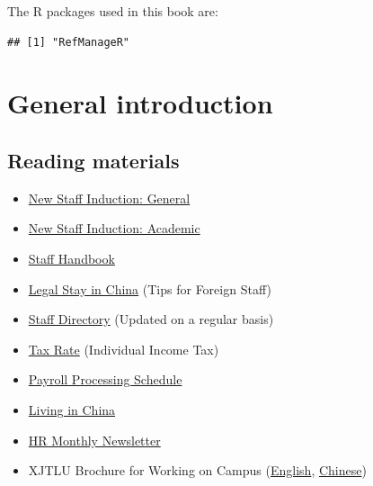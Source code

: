 \documentclass[
]{book}
\providecommand{\tightlist}{%
  \setlength{\itemsep}{0pt}\setlength{\parskip}{0pt}}
\begin{document}
The R packages used in this book are:

\begin{verbatim}
## [1] "RefManageR"
\end{verbatim}

\mainmatter

\hypertarget{general-introduction}{%
\chapter{General introduction}\label{general-introduction}}

\hypertarget{reading-materials}{%
\section{Reading materials}\label{reading-materials}}

\begin{itemize}
\tightlist
\item
  \href{https://box.xjtlu.edu.cn/\#common/lib/633bf817-899c-4be7-ab42-1d4986349f4c/New\%20Staff\%20Induction}{New Staff Induction: General}
\item
  \href{https://box.xjtlu.edu.cn/\#common/lib/76a264ad-c956-4ed2-abd7-7088081fe1fd/}{New Staff Induction: Academic}
\item
  \href{https://box.xjtlu.edu.cn/smart-link/1d9f1e2d-39e6-46de-b46f-e459502ed6df/}{Staff Handbook}
\item
  \href{https://box.xjtlu.edu.cn/smart-link/88e4699f-4ee6-43aa-a83d-0c86c1589818/}{Legal Stay in China} (Tips for Foreign Staff)
\item
  \href{https://box.xjtlu.edu.cn/smart-link/f7764aa3-7a36-40a7-bf2d-47f8bc57b1e7/}{Staff Directory} (Updated on a regular basis)
\item
  \href{https://box.xjtlu.edu.cn/smart-link/1999109a-e714-4ada-ade1-4785e256b15d/}{Tax Rate} (Individual Income Tax)
\item
  \href{https://box.xjtlu.edu.cn/smart-link/27acb50a-1e80-46df-843a-a944d36764d5/}{Payroll Processing Schedule}
\item
  \href{https://www.expat.com/en/destination/asia/china/}{Living in China}
\item
  \href{https://connect.xjtlu.edu.cn/user/td-hr/hr-monthly-newsletter-december-2019}{HR Monthly Newsletter}
\item
  XJTLU Brochure for Working on Campus (\href{https://box.xjtlu.edu.cn/smart-link/50c776fc-eec7-4219-a03b-eca4ad1d577f/}{English}, \href{https://box.xjtlu.edu.cn/smart-link/e678f16a-a01e-44ba-87f2-4cddf3bc2c23/}{Chinese})
\end{itemize}
\end{document}
